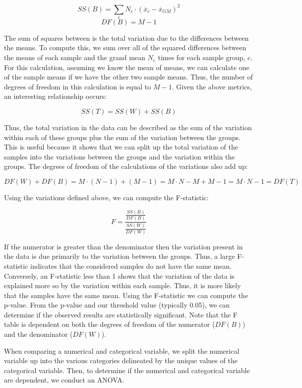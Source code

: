 \documentclass{article}
\begin{document}
\[SS(B) = \sum_{c} N_c \cdot (\overline{x}_c - \overline{x}_{GM})^2\]
\[DF(B) = M - 1\]

\noindent
The sum of squares between is the total variation due to the differences between the means. To compute this, we sum over all of the squared differences between the means of each sample and the grand mean $N_c$ times for each sample group, $c$. For this calculation, assuming we know the mean of means, we can calculate one of the sample means if we have the other two sample means. Thus, the number of degrees of freedom in this calculation is equal to $M - 1$. Given the above metrics, an interesting relationship occurs:

\[SS(T) = SS(W) + SS(B)\]

\noindent
Thus, the total variation in the data can be described as the sum of the variation within each of these groups plus the sum of the variation between the groups. This is useful because it shows that we can split up the total variation of the samples into the variations between the groups and the variation within the groups. The degrees of freedom of the calculations of the variations also add up:

\[DF(W) + DF(B) = M \cdot (N - 1) + (M - 1) = M \cdot N - M + M - 1 = M \cdot N - 1 = DF(T)\]

\noindent
Using the variations defined above, we can compute the F-statistic:

\[F  = \frac{\frac{SS(B)}{DF(B)}}{\frac{SS(W)}{DF(W)}}\]

\noindent
If the numerator is greater than the denominator then the variation present in the data is due primarily to the variation between the groups. Thus, a large F-statistic indicates that the considered samples do not have the same mean. Conversely, an F-statistic less than 1 shows that the variation of the data is explained more so by the variation within each sample. Thus, it is more likely that the samples have the same mean. Using the F-statistic we can compute the p-value. From the p-value and our threshold value (typically 0.05), we can determine if the observed results are statistically significant. Note that the F table is dependent on both the degrees of freedom of the numerator ($DF(B)$) and the denominator ($DF(W)$). 

\noindent
When comparing a numerical and categorical variable, we split the numerical variable up into the various categories delineated by the unique values of the categorical variable. Then, to determine if the numerical and categorical variable are dependent, we conduct an ANOVA.  
\end{document}
